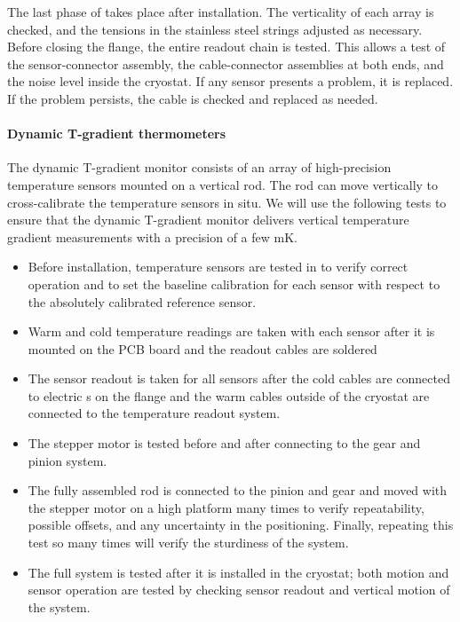 The last phase of  takes place after installation. 
The verticality of each array %
is checked, and the tensions in the stainless steel strings adjusted as necessary.
Before closing the flange, the entire readout chain is %
tested.  
This allows a test of the sensor-connector assembly, the cable-connector assemblies at both ends, and the noise level inside the cryostat.
If any sensor presents a problem, it is replaced. If the problem persists, the cable is checked and replaced as needed.

\paragraph{Dynamic T-gradient thermometers}
\label{sec:fdgen-slow-cryo-qc-thdy}

The dynamic T-gradient monitor consists of an array of high-precision temperature sensors mounted on a vertical rod. The rod can move vertically to cross-calibrate the temperature sensors in situ. %
We will use the following %
tests to ensure that the dynamic T-gradient monitor delivers vertical temperature gradient measurements with a precision of a few \si{mK}.

\begin{itemize}
\item
Before installation, temperature sensors are tested in    to verify correct operation and to set the baseline calibration for each sensor with respect to the absolutely calibrated reference sensor. 
\item
Warm and cold temperature readings are taken with each sensor after it is mounted on the PCB board and the readout cables are soldered %
\item
The sensor readout is taken for all sensors after the cold cables are connected to electric \fdth{}s on the flange and the warm cables outside of the cryostat are connected to the temperature readout system.
\item 
The stepper motor is tested before and after connecting to the gear and pinion system.
\item
The fully assembled rod is connected to the pinion and gear and moved with the stepper motor on a high platform many times to verify repeatability, possible offsets, and any uncertainty in the positioning. Finally, repeating this test so many times will verify the sturdiness of the system.
\item
The full system is tested after it is installed in the cryostat; both motion and sensor operation are tested by checking %
sensor readout and vertical motion of the system.
\end{itemize} 

